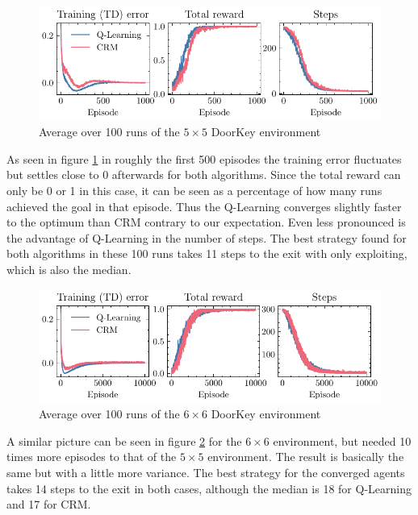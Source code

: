 \documentclass[12pt, a4paper]{article}
\begin{document}
\begin{figure}[ht!]
	\centering
	\includegraphics[width=\textwidth]{figures/fig_100runs_5x5.pdf}
	\caption{Average over 100 runs of the $5 \times 5$ DoorKey environment}
	\label{fig:5x5}
\end{figure}

As seen in figure \ref{fig:5x5} in roughly the first 500 episodes the training error fluctuates but settles close to 0 afterwards for both algorithms. Since the total reward can only be 0 or 1 in this case, it can be seen as a percentage of how many runs achieved the goal in that episode. Thus the Q-Learning converges slightly faster to the optimum than CRM contrary to our expectation. Even less pronounced is the advantage of Q-Learning in the number of steps. The best strategy found for both algorithms in these 100 runs takes 11 steps to the exit with only exploiting, which is also the median.

\begin{figure}[ht!]
	\centering
	\includegraphics[width=\textwidth]{figures/fig_100runs_6x6.pdf}
	\caption{Average over 100 runs of the $6 \times 6$ DoorKey environment}
	\label{fig:6x6}
\end{figure}

A similar picture can be seen in figure \ref{fig:6x6} for the $6 \times 6$ environment, but needed 10 times more episodes to that of the $5 \times 5$ environment. The result is basically the same but with a little more variance. The best strategy for the converged agents takes 14 steps to the exit in both cases, although the median is 18 for Q-Learning and 17 for CRM.
\end{document}
